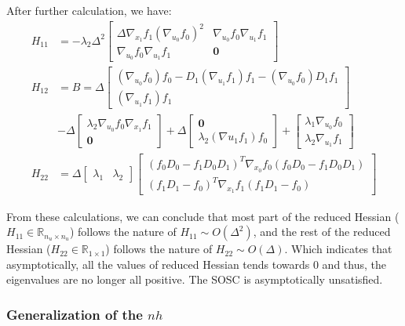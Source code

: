 \documentclass{article}
\begin{document}
After further calculation, we have:
\[
\begin{aligned}
H_{11} &= -\lambda_2 \Delta^2 \left[\begin{matrix}
\Delta \nabla _{x_1} f_1 (\nabla_{u_0}f_0)^2 & \nabla_{u_0}f_0\nabla_{u_1}f_1 \\
\nabla_{u_0}f_0\nabla_{u_1}f_1 & \mathbf{0}
\end{matrix} \right] \\ 
H_{12} &= B = 
\Delta \left[\begin{matrix}
    (\nabla_{u_0}f_0) f_0 - D_1 (\nabla_{u_1}f_1)f_1 - (\nabla_{u_0}f_0) D_1f_1 \\
    (\nabla_{u_1}f_1)f_1
\end{matrix}\right]
\\ &- \Delta \left[ \begin{matrix}
    \lambda_2 \nabla_{u_0}f_0 \nabla_{x_1}f_1 \\ \mathbf{0}
\end{matrix}\right]
+\Delta\left[\begin{matrix}
    \mathbf{0} \\ \lambda_2(\nabla{u_1}f_1)f_0    
    \end{matrix} \right]+\left[\begin{matrix}
        \lambda_1\nabla_{u_0}f_0 \\ \lambda_2\nabla_{u_1}f_1
    \end{matrix}\right]
\\
H_{22} &= \Delta \left[\begin{matrix}
    \lambda_1 & \lambda_2
\end{matrix}\right]
\left[\begin{matrix}
    (f_0D_0-f_1D_0D_1)^T\nabla_{x_0}f_0(f_0D_0-f_1D_0D_1)  \\ (f_1D_1-f_0)^T\nabla_{x_1}f_1(f_1D_1-f_0)
\end{matrix}\right]
\end{aligned}
\]

From these calculations, we can conclude that most part of the reduced Hessian ($H_{11}\in\mathbb{R}_{n_u\times n_u}$) follows the nature of $H_{11}\sim O(\Delta^2)$, and the rest of the reduced Hessian ($H_{22}\in\mathbb{R}_{1\times1}$) follows the nature of $H_{22}\sim O(\Delta)$. Which indicates that asymptotically, all the values of reduced Hessian tends towards 0 and thus, the eigenvalues are no longer all positive. The SOSC is asymptotically unsatisfied.

\subsubsection{Generalization of the $nh$}
\end{document}
